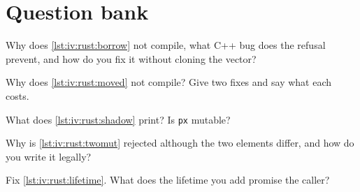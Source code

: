 \label{lst:iv:rust:unsafe}

\section{Question bank}

\begin{interviewq}\label{iq:iv:rust:1}
Why does \cref{lst:iv:rust:borrow} not compile, what C++ bug does the refusal prevent, and how do you fix it without cloning the
vector?
\end{interviewq}

\label{lst:iv:rust:moved}

\begin{interviewq}\label{iq:iv:rust:2}
Why does \cref{lst:iv:rust:moved} not compile? Give two fixes and say what each costs.
\end{interviewq}

\label{lst:iv:rust:shadow}

\begin{interviewq}\label{iq:iv:rust:3}
What does \cref{lst:iv:rust:shadow} print? Is \texttt{px} mutable?
\end{interviewq}

\label{lst:iv:rust:twomut}

\begin{interviewq}\label{iq:iv:rust:4}
Why is \cref{lst:iv:rust:twomut} rejected although the two elements differ, and how do you write it legally?
\end{interviewq}

\label{lst:iv:rust:lifetime}

\begin{interviewq}\label{iq:iv:rust:5}
Fix \cref{lst:iv:rust:lifetime}. What does the lifetime you add promise the caller?
\end{interviewq}

